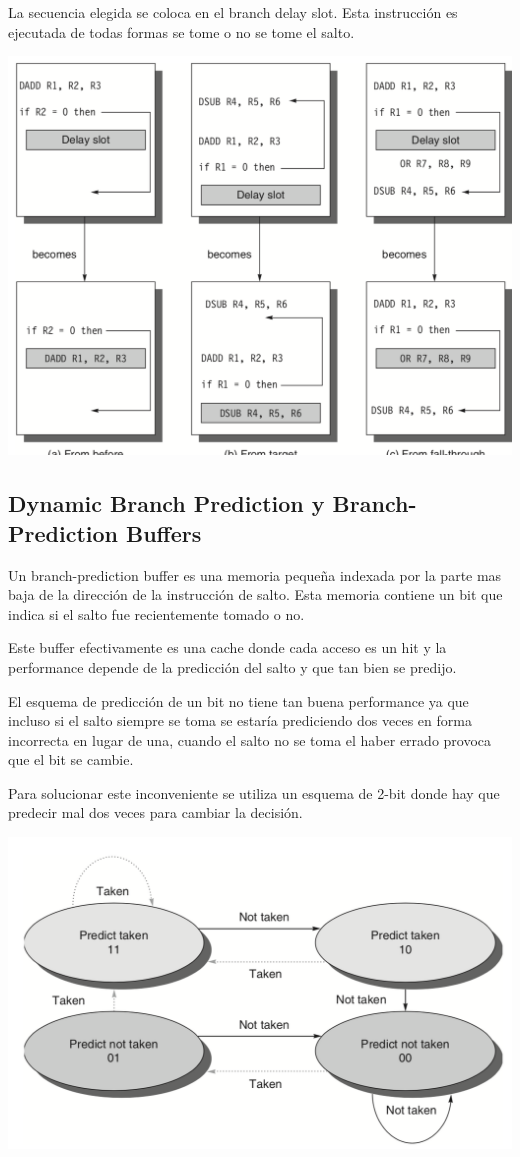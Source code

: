 La secuencia elegida se coloca en el branch delay slot. Esta instrucción es ejecutada de todas formas se tome o no se tome el salto.


\begin{center}
 \includegraphics[scale=.5,keepaspectratio=true]{gfx/static_branch.png}
\end{center}



\subsection{Dynamic Branch Prediction y Branch-Prediction Buffers} 
Un branch-prediction buffer es una memoria pequeña indexada por la parte mas baja de la dirección de la instrucción de salto. Esta memoria contiene un bit que indica si el salto fue recientemente tomado o no. 
 
Este buffer efectivamente es una cache donde cada acceso es un hit y la performance depende de la predicción del salto y que tan bien se predijo.

El esquema de predicción de un bit no tiene tan buena performance ya que incluso si el salto siempre se toma se estaría prediciendo dos veces en forma incorrecta en lugar de una, cuando el salto no se toma el haber errado provoca que el bit se cambie.
 
Para solucionar este inconveniente se utiliza un esquema de 2-bit donde hay que predecir mal dos veces para cambiar la decisión.
 

\begin{center}
 \includegraphics[scale=.5,keepaspectratio=true]{gfx/branch_prediction.png}
\end{center}

